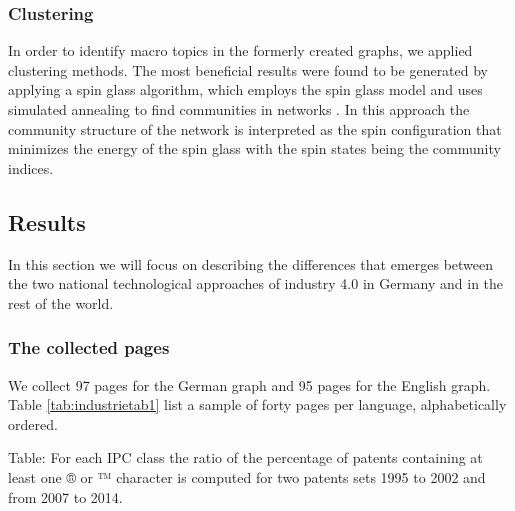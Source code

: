 \documentclass[]{book}
\begin{document}
\subsubsection*{Clustering}\label{clustering}

In order to identify macro topics in the formerly created graphs, we
applied clustering methods. The most beneficial results were found to be
generated by applying a spin glass algorithm, which employs the spin
glass model and uses simulated annealing to find communities in networks
\citep{reichardt2006statistical}. In this approach the community
structure of the network is interpreted as the spin configuration that
minimizes the energy of the spin glass with the spin states being the
community indices.

\subsection{Results}\label{results-8}

In this section we will focus on describing the differences that emerges
between the two national technological approaches of industry 4.0 in
Germany and in the rest of the world.

\subsubsection*{The collected pages}\label{the-collected-pages}

We collect 97 pages for the German graph and 95 pages for the English
graph. Table \ref{tab:industrietab1} list a sample of forty pages per
language, alphabetically ordered.

Table: \label{tab:industrietab1} For each IPC class the ratio of the
percentage of patents containing at least one ® or ™ character is
computed for two patents sets 1995 to 2002 and from 2007 to 2014.
\end{document}
